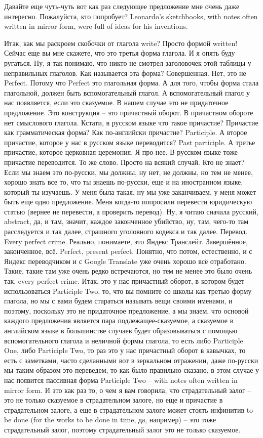 \documentclass[main.tex]{subfiles}
\begin{document}
Давайте еще чуть-чуть вот как раз следующее предложение мне очень даже интересно.
Пожалуйста, кто попробует?
Leonardo's sketchbooks, with notes often written in mirror form, were full of ideas for his inventions.

Итак, как мы раскроем скобочки от глагола write? Просто формой written!
Сейчас еще вы мне скажете, что это третья форма глагола.
И я опять буду ругаться.
Ну, я так понимаю, что никто не смотрел заголовочек этой таблицы у неправильных глаголов.
Как называется эта форма? Совершенная.
Нет, это не Perfect.
Потому что Perfect это глагольная форма.
А для того, чтобы форма стала глагольной, должен быть вспомогательный глагол.
А вспомогательный глагол у нас появляется, если это сказуемое.
В нашем случае это не придаточное предложение.
Это конструкция -- это причастный оборот.
В причастном обороте нет смыслового глагола.
Кстати, в русском языке что такое причастие? Причастие как грамматическая форма?
Как по-английски причастие? Participle.
А второе причастие, которое у нас в русском языке переводится? Past participle.
А третье причастие, которое церковная церемония.
Я про нее.
В русском языке тоже причастие переводится.
То же слово.
Просто на всякий случай.
Кто не знает?
Если мы знаем это по-русски, мы должны, ну нет, не должны, но тем не менее, хорошо знать все то, что ты знаешь по-русски, еще и на иностранном языке, который ты изучаешь.
У меня была такая, ну мы уже заканчиваем, у меня может быть еще одно предложение.
Меня когда-то попросили перевести юридическую статью (вернее не перевести, а проверить перевод).
Ну, я читаю сначала русский, abstract, да, и там, значит, каждое законченное убийство, ну, там, чего-то там расследуется и так далее, страшного уголовного кодекса и так далее.
Перевод.
Every perfect crime.
Реально, понимаете, это Яндекс Транслейт.
Завершённое, законченное, всё.
Perfect, present perfect.
Понятно, что потом, естественно, и с Яндекс переводчиком и с Google Translate уже очень хорошо всё отработано.
Такие, такие там уже очень редко встречаются, но тем не менее это было очень так, every perfect crime.
Итак, это у нас причастный оборот, в котором будет использоваться Participle Two, то, что вы помните со школы как третью форму глагола, но мы с вами будем стараться называть вещи своими именами, и поэтому, поскольку это не придаточное предложение, а мы знаем, что основой каждого предложения является пара подлежащее-сказуемое, а сказуемое в английском языке в большинстве случаев будет образовываться с помощью вспомогательного глагола и неличной формы глагола, то есть либо Participle One, либо Participle Two, то раз это у нас причастный оборот в кавычках, то есть с заметками, часто сделанными вот в зеркальном отражении, даже по-русски мы таким образом это переведем, то как было правильно сказано, в этом случае у нас появится пассивная форма Participle Two -- with notes often written in mirror form.
И это как раз то, о чем я вам говорила, что страдательный залог -- это не только сказуемое в страдательном залоге, но еще и причастие в страдательном залоге, а еще в страдательном залоге может стоять инфинитив to be done (for the works to be done in time, да, например) -- это тоже страдательный залог, поэтому страдательный залог это не только сказуемое.
\end{document}
